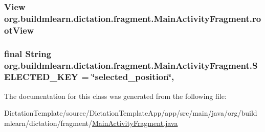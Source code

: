 \subsubsection[{\texorpdfstring{root\+View}{rootView}}]{\setlength{\rightskip}{0pt plus 5cm}View org.\+buildmlearn.\+dictation.\+fragment.\+Main\+Activity\+Fragment.\+root\+View\hspace{0.3cm}{\ttfamily [private]}}\hypertarget{classorg_1_1buildmlearn_1_1dictation_1_1fragment_1_1MainActivityFragment_ad705eb8f000e5cb49010a945d0e063cf}{}\label{classorg_1_1buildmlearn_1_1dictation_1_1fragment_1_1MainActivityFragment_ad705eb8f000e5cb49010a945d0e063cf}
\subsubsection[{\texorpdfstring{S\+E\+L\+E\+C\+T\+E\+D\+\_\+\+K\+EY}{SELECTED_KEY}}]{\setlength{\rightskip}{0pt plus 5cm}final String org.\+buildmlearn.\+dictation.\+fragment.\+Main\+Activity\+Fragment.\+S\+E\+L\+E\+C\+T\+E\+D\+\_\+\+K\+EY = \char`\"{}selected\+\_\+position\char`\"{}\hspace{0.3cm}{\ttfamily [static]}, {\ttfamily [private]}}\hypertarget{classorg_1_1buildmlearn_1_1dictation_1_1fragment_1_1MainActivityFragment_a8ee42ebe6cc76df5d24ac303838d8072}{}\label{classorg_1_1buildmlearn_1_1dictation_1_1fragment_1_1MainActivityFragment_a8ee42ebe6cc76df5d24ac303838d8072}


The documentation for this class was generated from the following file\+:\begin{DoxyCompactItemize}
\item 
Dictation\+Template/source/\+Dictation\+Template\+App/app/src/main/java/org/buildmlearn/dictation/fragment/\hyperlink{DictationTemplate_2source_2DictationTemplateApp_2app_2src_2main_2java_2org_2buildmlearn_2dictati3611c804a9f7d5640dad8f6b7ba116ed}{Main\+Activity\+Fragment.\+java}\end{DoxyCompactItemize}
